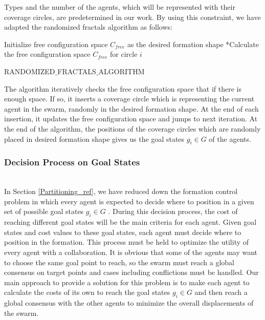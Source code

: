 Types and the number of the agents, which will be represented with their coverage circles, are predetermined in our work. By using this constraint, we have adapted the randomized fractals algorithm as follows:
		
\begin{algorithm}[H]
Initialize free configuration space $C_{free}$ as the desired formation shape \newline
{}
{		
*Calculate the free configuration space $C_{free}$ for circle $i$\;
}\												
\caption{RANDOMIZED$\_$FRACTALS$\_$ALGORITHM} 
\end{algorithm}
		
The algorithm iteratively checks the free configuration space that if there is enough space. If so, it inserts a coverage circle which is representing the current agent in the swarm, randomly in the desired formation shape. At the end of each insertion, it updates the free configuration space and jumps to next iteration. At the end of the algorithm, the positions of the coverage circles which are randomly placed in desired formation shape gives us the goal states $g_i \in G$  of the agents. 
	
\subsubsection{Decision Process on Goal States}\hspace{0pt} \label{DecisionProcess Ref} \\
In Section \ref{Partitioning_ref}, we have reduced down the formation control problem in which every agent is expected to decide where to position in a given set of possible goal states $g_i \in G$ .  During this decision process, the cost of reaching different goal states will be the main criteria for each agent. Given goal states and cost values to these goal states, each agent must decide where to position in the formation. This process must be held to optimize the utility of every agent with a collaboration. It is obvious that some of the agents may want to choose the same goal point to reach, so the swarm must reach a global consensus on target points and cases including conflictions must be handled. Our main approach to provide a solution for this problem is to make each agent to calculate the costs of its own to reach the goal states $g_i \in G$ and then reach a global consensus with the other agents to minimize the overall displacements of the swarm. 

